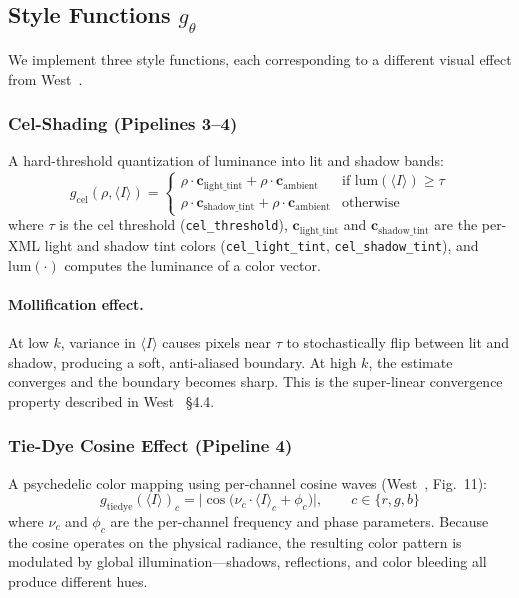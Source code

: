 \documentclass{article}
\begin{document}
\subsection{Style Functions $g_\theta$}
\label{sec:style_functions}

We implement three style functions, each corresponding to a different visual effect from West~\cite{west2024stylized}.

\subsubsection{Cel-Shading (Pipelines 3--4)}
\label{sec:cel}

A hard-threshold quantization of luminance into lit and shadow bands:
\begin{equation}
    g_{\text{cel}}(\rho, \langle I \rangle) = 
    \begin{cases}
        \rho \cdot \mathbf{c}_{\text{light\_tint}} + \rho \cdot \mathbf{c}_{\text{ambient}} & \text{if } \text{lum}(\langle I \rangle) \geq \tau \\
        \rho \cdot \mathbf{c}_{\text{shadow\_tint}} + \rho \cdot \mathbf{c}_{\text{ambient}} & \text{otherwise}
    \end{cases}
    \label{eq:cel}
\end{equation}
where $\tau$ is the cel threshold (\texttt{cel\_threshold}), $\mathbf{c}_{\text{light\_tint}}$ and $\mathbf{c}_{\text{shadow\_tint}}$ are the per-XML light and shadow tint colors (\texttt{cel\_light\_tint}, \texttt{cel\_shadow\_tint}), and $\text{lum}(\cdot)$ computes the luminance of a color vector.

\paragraph{Mollification effect.} At low $k$, variance in $\langle I \rangle$ causes pixels near $\tau$ to stochastically flip between lit and shadow, producing a soft, anti-aliased boundary. At high $k$, the estimate converges and the boundary becomes sharp. This is the super-linear convergence property described in West~\cite{west2024stylized} \S4.4.

\subsubsection{Tie-Dye Cosine Effect (Pipeline 4)}
\label{sec:tiedye}

A psychedelic color mapping using per-channel cosine waves (West~\cite{west2024stylized}, Fig.~11):
\begin{equation}
    g_{\text{tiedye}}(\langle I \rangle)_c = \bigl|\cos\!\bigl(\nu_c \cdot \langle I \rangle_c + \phi_c\bigr)\bigr|, \qquad c \in \{r, g, b\}
    \label{eq:tiedye}
\end{equation}
where $\nu_c$ and $\phi_c$ are the per-channel frequency and phase parameters. Because the cosine operates on the physical radiance, the resulting color pattern is modulated by global illumination—shadows, reflections, and color bleeding all produce different hues.
\end{document}
